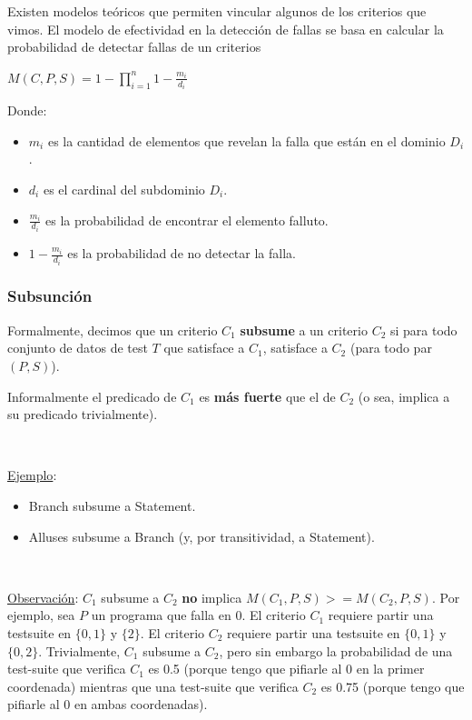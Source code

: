 \documentclass[]{article}
\begin{document}
Existen modelos teóricos que permiten vincular algunos de los criterios que vimos. El modelo de efectividad en la detección de fallas se basa en calcular la probabilidad de detectar fallas de un criterios
\begin{center}
	$\displaystyle M(C,P,S) = 1-\prod_{i=1}^{n}{1-\frac{m_i}{d_i}}$
\end{center}
Donde:
\begin{itemize}
	\item $m_i$ es la cantidad de elementos que revelan la falla que están en el dominio $D_i$.
	\item $d_i$ es el cardinal del subdominio $D_i$.
	\item $\frac{m_i}{d_i}$ es la probabilidad de encontrar el elemento falluto.
	\item $1-\frac{m_i}{d_i}$ es la probabilidad de no detectar la falla.
\end{itemize}



\subsubsection{Subsunción}
Formalmente, decimos que un criterio $C_1$ \textbf{subsume} a un criterio $C_2$ si para todo conjunto de datos de test $T$ que satisface a $C_1$, satisface a $C_2$ (para todo par $(P,S)$).

Informalmente el predicado de $C_1$ es \textbf{más fuerte} que el de $C_2$ (o sea, implica a su predicado trivialmente).

~\newline

\underline{Ejemplo}:
\begin{itemize}
	\item Branch subsume a Statement.
	\item Alluses subsume a Branch (y, por transitividad, a Statement).
\end{itemize}

~\newline

\underline{Observación}: $C_1$ subsume a $C_2$ \textbf{no} implica $M(C_1, P, S) >= M (C_2, P,S)$. Por ejemplo, sea $P$ un programa que falla en 0. El criterio $C_1$ requiere partir una testsuite en $\{0,1\}$ y $\{2\}$. El criterio $C_2$ requiere partir una testsuite en $\{0,1\}$ y $\{0,2\}$. Trivialmente, $C_1$ subsume a $C_2$, pero sin embargo la probabilidad de una test-suite que verifica $C_1$ es 0.5 (porque tengo que pifiarle al 0 en la primer coordenada) mientras que una test-suite que verifica $C_2$ es 0.75 (porque tengo que pifiarle al 0 en ambas coordenadas).
\end{document}
